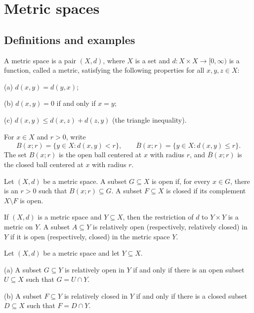 \section{Metric spaces}
\subsection{Definitions and examples}

\begin{de}
A metric space is a pair $(X,d)$, where $X$ is a set and
$d:X\times X\to[0,\infty)$ is a function, called a metric, satisfying the
following properties for all $x,y,z\in X$:

(a) $d(x,y)=d(y,x)$;

(b) $d(x,y)=0$ if and only if $x=y$;

(c) $d(x,y)\leq d(x,z)+d(z,y)$ (the triangle inequality).

For $x\in X$ and $r>0$, write
\[
B(x;r)=\{y\in X:d(x,y)<r\},\qquad
\overline{B}(x;r)=\{y\in X:d(x,y)\leq r\}.
\]
The set $B(x;r)$ is the open ball centered at $x$ with radius $r$, and
$\overline{B}(x;r)$ is the closed ball centered at $x$ with radius $r$.
\end{de}

\begin{de}
Let $(X,d)$ be a metric space. A subset $G\subseteq X$ is open if, for every
$x\in G$, there is an $r>0$ such that $B(x;r)\subseteq G$. A subset
$F\subseteq X$ is closed if its complement $X\setminus F$ is open.
\end{de}

\begin{de}
If $(X,d)$ is a metric space and $Y\subseteq X$, then the restriction of $d$
to $Y\times Y$ is a metric on $Y$. A subset $A\subseteq Y$ is relatively open
(respectively, relatively closed) in $Y$ if it is open (respectively, closed)
in the metric space $Y$.
\end{de}

\begin{thm}
Let $(X,d)$ be a metric space and let $Y\subseteq X$.

(a) A subset $G\subseteq Y$ is relatively open in $Y$ if and only if there is
an open subset $U\subseteq X$ such that $G=U\cap Y$.

(b) A subset $F\subseteq Y$ is relatively closed in $Y$ if and only if there
is a closed subset $D\subseteq X$ such that $F=D\cap Y$.
\end{thm}


